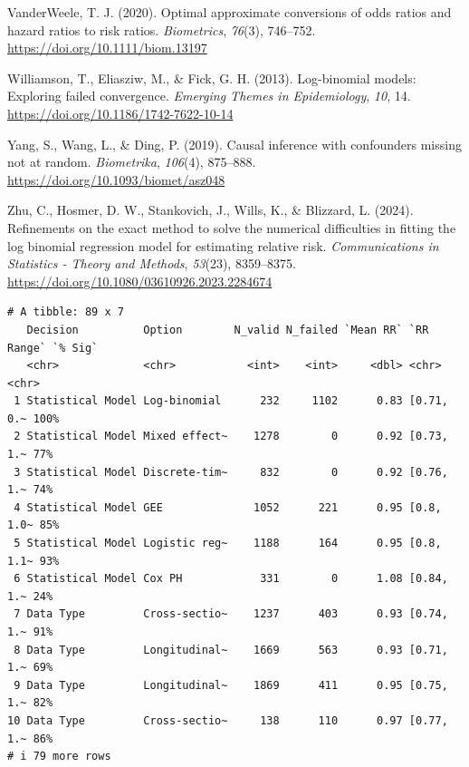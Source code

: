 \documentclass[
  man,
  floatsintext,
  longtable,
  nolmodern,
  notxfonts,
  notimes,
  colorlinks=true,linkcolor=blue,citecolor=blue,urlcolor=blue]{apa7}
\newlength{\cslhangindent}
\newenvironment{CSLReferences}[2] %
 {\begin{list}{}{%
  \setlength{\itemindent}{0pt}
  \setlength{\leftmargin}{0pt}
  \setlength{\parsep}{0pt}
  \ifodd #1
   \setlength{\leftmargin}{\cslhangindent}
   \setlength{\itemindent}{-1\cslhangindent}
  \fi
  \setlength{\itemsep}{#2\baselineskip}}}
 {\end{list}}
\begin{document}
\begin{CSLReferences}{1}{0}
VanderWeele, T. J. (2020). Optimal approximate conversions of odds
ratios and hazard ratios to risk ratios. \emph{Biometrics},
\emph{76}(3), 746--752. \url{https://doi.org/10.1111/biom.13197}

Williamson, T., Eliasziw, M., \& Fick, G. H. (2013). Log-binomial
models: Exploring failed convergence. \emph{Emerging Themes in
Epidemiology}, \emph{10}, 14.
\url{https://doi.org/10.1186/1742-7622-10-14}

Yang, S., Wang, L., \& Ding, P. (2019). Causal inference with
confounders missing not at random. \emph{Biometrika}, \emph{106}(4),
875--888. \url{https://doi.org/10.1093/biomet/asz048}

Zhu, C., Hosmer, D. W., Stankovich, J., Wills, K., \& Blizzard, L.
(2024). Refinements on the exact method to solve the numerical
difficulties in fitting the log binomial regression model for estimating
relative risk. \emph{Communications in Statistics - Theory and Methods},
\emph{53}(23), 8359--8375.
\url{https://doi.org/10.1080/03610926.2023.2284674}

\end{CSLReferences}

\begin{verbatim}
# A tibble: 89 x 7
   Decision          Option        N_valid N_failed `Mean RR` `RR Range` `% Sig`
   <chr>             <chr>           <int>    <int>     <dbl> <chr>      <chr>  
 1 Statistical Model Log-binomial      232     1102      0.83 [0.71, 0.~ 100%   
 2 Statistical Model Mixed effect~    1278        0      0.92 [0.73, 1.~ 77%    
 3 Statistical Model Discrete-tim~     832        0      0.92 [0.76, 1.~ 74%    
 4 Statistical Model GEE              1052      221      0.95 [0.8, 1.0~ 85%    
 5 Statistical Model Logistic reg~    1188      164      0.95 [0.8, 1.1~ 93%    
 6 Statistical Model Cox PH            331        0      1.08 [0.84, 1.~ 24%    
 7 Data Type         Cross-sectio~    1237      403      0.93 [0.74, 1.~ 91%    
 8 Data Type         Longitudinal~    1669      563      0.93 [0.71, 1.~ 69%    
 9 Data Type         Longitudinal~    1869      411      0.95 [0.75, 1.~ 82%    
10 Data Type         Cross-sectio~     138      110      0.97 [0.77, 1.~ 86%    
# i 79 more rows
\end{verbatim}
\end{document}
